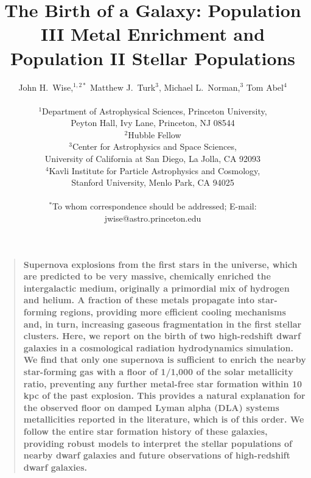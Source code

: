 \documentclass[12pt]{article}
\title{The Birth of a Galaxy: Population III Metal Enrichment and
  Population II Stellar Populations}
\author
{John H.~Wise,$^{1,2\ast}$ Matthew J.~Turk$^{3}$, Michael
  L.~Norman,$^{3}$ Tom Abel$^{4}$\\
\\
\normalsize{$^{1}$Department of Astrophysical Sciences, Princeton
University,}\\
\normalsize{Peyton Hall, Ivy Lane, Princeton, NJ 08544}\\
\normalsize{$^{2}$Hubble Fellow}\\
\normalsize{$^{3}$Center for Astrophysics and Space Sciences,}\\
\normalsize{University of California at San Diego, La Jolla, CA 92093}\\
\normalsize{$^{4}$Kavli Institute for Particle Astrophysics and
  Cosmology, }\\
\normalsize{Stanford University, Menlo Park, CA 94025}\\
\\
\normalsize{$^\ast$To whom correspondence should be addressed; E-mail:
jwise@astro.princeton.edu}
}
\date{}
\newenvironment{sciabstract}{%
\begin{quote} \bf}
{\end{quote}}
\begin{document}
 


\baselineskip24pt


\maketitle 


\begin{sciabstract}
  Supernova explosions from the first stars in the universe, which are
  predicted to be very massive, chemically enriched the intergalactic
  medium, originally a primordial mix of hydrogen and helium.  A
  fraction of these metals propagate into star-forming regions,
  providing more efficient cooling mechanisms and, in turn, increasing
  gaseous fragmentation in the first stellar clusters.  Here, we
  report on the birth of two high-redshift dwarf galaxies in a
  cosmological radiation hydrodynamics simulation.  We find that only
  one supernova is sufficient to enrich the nearby star-forming gas
  with a floor of 1/1,000 of the solar metallicity ratio, preventing
  any further metal-free star formation within 10 kpc of the past
  explosion.  This provides a natural explanation for the observed
  floor on damped Lyman alpha (DLA) systems metallicities reported in
  the literature, which is of this order.  We follow the entire star
  formation history of these galaxies, providing robust models to
  interpret the stellar populations of nearby dwarf galaxies and
  future observations of high-redshift dwarf galaxies.
\end{sciabstract}

\end{document}
